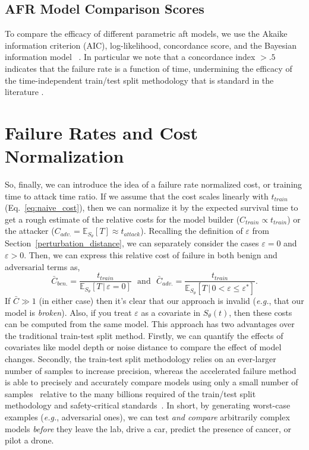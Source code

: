 \subsection{AFR Model Comparison Scores}
\label{metrics}

To compare the efficacy of different parametric aft models, we use the Akaike information criterion (AIC), log-likelihood, concordance score, and the Bayesian information model ~\citep{stoica2004model,taddy2019business}. In particular we note that a concordance index $> .5$ indicates that the failure rate is a function of time, undermining the efficacy of the time-independent train/test split methodology that is standard in the literature \cite{concordance}.





\section{Failure Rates and Cost Normalization}


\label{cost_normalization}


So, finally, we can introduce the idea of a failure rate normalized cost, or training time to attack time ratio. If we assume that the cost scales linearly with $t_{train}$ (Eq.~\ref{eq:naive_cost}), then we can normalize it by the expected survival time to get a rough estimate of the relative costs for the model builder ($C_{train} \propto t_{train}$) or the attacker ($C_{adv.} = \mathbb{E}_{S_\theta}[T] \approx t_{attack}$). Recalling the definition of $\varepsilon$ from Section~\ref{perturbation_distance}, we can separately consider the cases $\varepsilon=0$ and $\varepsilon > 0$. Then, we can express this relative cost of failure in both benign and adversarial terms as,
\begin{equation}
	\bar{C}_{ben.} = \frac{t_{train}}{\mathbb{E}_{S_\theta}[T \,|\, \varepsilon = 0] }
	\text{~~and~~}
	\bar{C}_{adv.}=\frac{t_{train}}{\mathbb{E}_{S_\theta}[T \,|\, 0 < \varepsilon \leq \varepsilon^*]}.
	\label{eq:cost}
\end{equation}
If $\bar{C} \gg 1$ (in either case) then it's clear that our approach is invalid (\textit{e.g.}, that our model is \textit{broken}). Also, if you treat $\varepsilon$ as a covariate in ${S_\theta}(t)$, then these costs can be computed from the same model.
This approach has two advantages over the traditional train-test split method. Firstly, we can quantify the effects of covariates like model depth or noise distance to compare the effect of model changes. Secondly, the train-test split methodology relies on an ever-larger number of samples to increase precision, whereas the accelerated failure method is able to precisely and accurately compare models using only a small number of samples~\cite{schmoor2000sample,lachin1981introduction} relative to the many billions required of the train/test split methodology and safety-critical standards~\cite{iso26262,IEC61508,IEC62034,meyers}.
In short, by generating worst-case examples (\textit{e.g.}, adversarial ones), we can test \textit{and compare} arbitrarily complex models \textit{before} they leave the lab, drive a car, predict the presence of cancer, or pilot a drone.